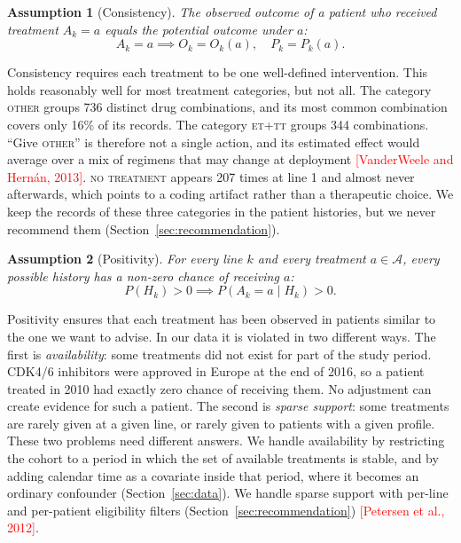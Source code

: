 \documentclass[a4paper,10pt]{article}
\newtheorem{assumption}{Assumption}
\newcommand{\todo}[1]{\textcolor{red}{#1}}
\begin{document}
\begin{assumption}[Consistency]
The observed outcome of a patient who received treatment $A_k = a$ equals the potential outcome under $a$:
\begin{equation}
    A_k = a \implies O_k = O_k(a), \quad P_k = P_k(a).
\end{equation}
\end{assumption}
Consistency requires each treatment to be one well-defined intervention. This holds reasonably well for most treatment categories, but not all. The category \textsc{other} groups 736 distinct drug combinations, and its most common combination covers only 16\% of its records. The category \textsc{et+tt} groups 344 combinations. ``Give \textsc{other}'' is therefore not a single action, and its estimated effect would average over a mix of regimens that may change at deployment \todo{[VanderWeele and Hern\'an, 2013]}. \textsc{no treatment} appears 207 times at line 1 and almost never afterwards, which points to a coding artifact rather than a therapeutic choice. We keep the records of these three categories in the patient histories, but we never recommend them (Section~\ref{sec:recommendation}).

\begin{assumption}[Positivity]
For every line $k$ and every treatment $a \in \mathcal{A}$, every possible history has a non-zero chance of receiving $a$:
\begin{equation}
    P(H_k) > 0 \implies P(A_k = a \mid H_k) > 0.
\end{equation}
\end{assumption}
Positivity ensures that each treatment has been observed in patients similar to the one we want to advise. In our data it is violated in two different ways. The first is \emph{availability}: some treatments did not exist for part of the study period. CDK4/6 inhibitors were approved in Europe at the end of 2016, so a patient treated in 2010 had exactly zero chance of receiving them. No adjustment can create evidence for such a patient. The second is \emph{sparse support}: some treatments are rarely given at a given line, or rarely given to patients with a given profile. These two problems need different answers. We handle availability by restricting the cohort to a period in which the set of available treatments is stable, and by adding calendar time as a covariate inside that period, where it becomes an ordinary confounder (Section~\ref{sec:data}). We handle sparse support with per-line and per-patient eligibility filters (Section~\ref{sec:recommendation}) \todo{[Petersen et al., 2012]}.
\end{document}
